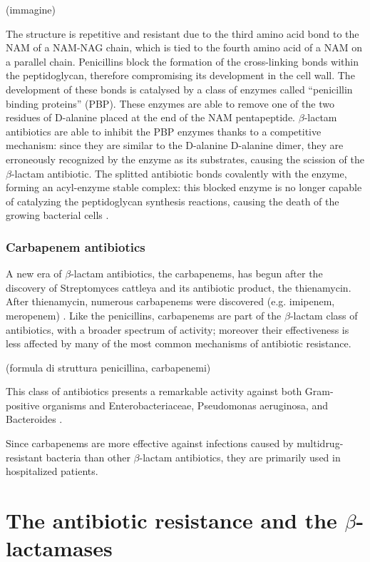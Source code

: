 \documentclass[11pt]{report}
\begin{document}
(immagine)

The structure is repetitive and resistant due to the third amino acid bond to the NAM of a NAM-NAG chain, which is tied to the fourth amino acid of a NAM on a parallel chain.
Penicillins block the formation of the cross-linking bonds within the peptidoglycan, therefore compromising its development in the cell wall. The development of these bonds is catalysed by a class of enzymes called “penicillin binding proteins” (PBP). These enzymes are able to remove one of the two residues of D-alanine placed at the end of the NAM pentapeptide.
$\beta$-lactam antibiotics are able to inhibit the PBP enzymes thanks to a competitive mechanism: since they are similar to the D-alanine D-alanine dimer, they are erroneously recognized by the enzyme as its substrates, causing the scission of the $\beta$-lactam antibiotic. The splitted antibiotic bonds covalently with the enzyme, forming an acyl-enzyme stable complex: this blocked enzyme is no longer capable of catalyzing the peptidoglycan synthesis reactions, causing the death of the growing bacterial cells \cite{KONG2010}.


\subsection{Carbapenem antibiotics}
A new era of $\beta$-lactam antibiotics, the carbapenems, has begun after the discovery of Streptomyces cattleya and its antibiotic product, the thienamycin.
After thienamycin, numerous carbapenems were discovered (e.g. imipenem, meropenem) \cite{Birnbaum1985}.
Like the penicillins, carbapenems are part of the $\beta$-lactam class of antibiotics, with a broader spectrum of activity; moreover their effectiveness is less affected by many of the most common mechanisms of antibiotic resistance.

(formula di struttura penicillina, carbapenemi)

This class of antibiotics presents a remarkable activity against both Gram-positive organisms and Enterobacteriaceae, Pseudomonas aeruginosa, and Bacteroides \cite{Neu1985}.

Since carbapenems are more effective against infections caused by multidrug-resistant bacteria than other $\beta$-lactam antibiotics, they are primarily used in hospitalized patients.

\chapter{The antibiotic resistance and the $\beta$-lactamases}
\end{document}
